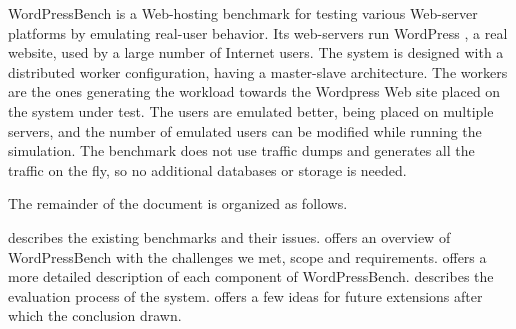WordPressBench is a Web-hosting benchmark for testing various Web-server platforms by emulating real-user behavior.  Its web-servers run WordPress \cite{Wordpress-website}, a real website, used by a large number of Internet users. The system is designed with a distributed worker configuration, having a master-slave architecture. The workers are the ones generating the workload towards the Wordpress Web site placed on the system under test. The users are emulated better, being placed on multiple servers, and the number of emulated users can be modified while running the simulation. The benchmark does not use traffic dumps and generates all the traffic on the fly, so no additional databases or storage is needed.

The remainder of the document is organized as follows. 

 describes the existing benchmarks and their issues.  offers an overview of WordPressBench with the challenges we met, scope and requirements.  offers a more detailed description of each component of  WordPressBench.  describes the evaluation process of the system.  offers a few ideas for future extensions after which the conclusion drawn.
